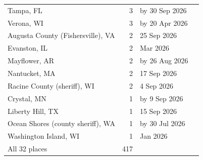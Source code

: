 \documentclass[11pt,twoside]{article}
\begin{document}
\begin{table}[htbp]
\begin{tabular}{lrll}
Tampa, FL & 3 & by 30 Sep 2026 & \citet{rm_tampa_fl,rm_tampa_fl_city} \\
Verona, WI & 3 & by 20 Apr 2026 & \citet{rm_verona_wi} \\
Augusta County (Fishersville), VA & 2 & 25 Sep 2026 & \citet{rm_augusta_va} \\
Evanston, IL & 2 & Mar 2026 & \citet{rm_evanston_il} \\
Mayflower, AR & 2 & by 26 Aug 2026 & \citet{rm_mayflower_ar} \\
Nantucket, MA & 2 & 17 Sep 2026 & \citet{rm_nantucket_ma} \\
Racine County (sheriff), WI & 2 & 4 Sep 2026 & \citet{rm_racine_wi} \\
Crystal, MN & 1 & by 9 Sep 2026 & \citet{rm_crystal_mn} \\
Liberty Hill, TX & 1 & 15 Sep 2026 & \citet{rm_libertyhill_tx} \\
Ocean Shores (county sheriff), WA & 1 & by 30 Jul 2026 & \citet{rm_oceanshores_wa} \\
Washington Island, WI & 1 & Jan 2026 & \citet{rm_washingtonisland_wi} \\
\midrule
All 32 places & \num{417} & & \\
\bottomrule
\end{tabular}
\end{table}
\end{document}
